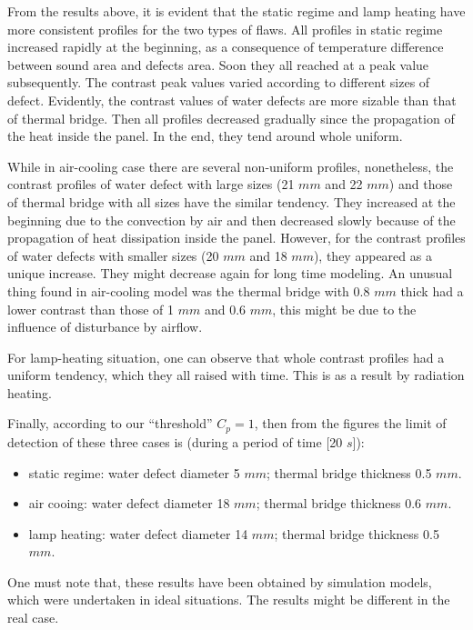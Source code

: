 \documentclass{tQRT2e}
\begin{document}
From the results above, it is evident that the static regime and lamp heating have more consistent profiles for the two types of flaws. All profiles in static regime increased rapidly at the beginning, as a consequence of temperature difference between sound area and defects area. Soon they all reached at a peak value subsequently. The contrast peak values varied according to different sizes of defect. Evidently, the contrast values of water defects are more sizable than that of thermal bridge. Then all profiles decreased gradually since the propagation of the heat inside the panel. In the end, they tend around whole uniform. 

While in air-cooling case there are several non-uniform profiles, nonetheless, the contrast profiles of water defect with large sizes (21 $mm $ and 22 $ mm $) and those of thermal bridge with all sizes have the similar tendency. They increased at the beginning due to the convection by air and then decreased slowly because of the propagation of heat dissipation inside the panel. However, for the contrast profiles of water defects with smaller sizes (20 $ mm $ and 18 $ mm $), they appeared as a unique increase. They might decrease again for long time modeling. An unusual thing found in air-cooling model was the thermal bridge with 0.8 $ mm $ thick had a lower contrast than those of 1 $mm $ and 0.6 $ mm $, this might be due to the influence of disturbance by airflow. 

For lamp-heating situation, one can observe that whole contrast profiles had a uniform tendency, which they all raised with time. This is as a result by radiation heating.

Finally, according to our “threshold” $ C_p  = 1$, then from the figures the limit of detection of these three cases is (during a period of time [20 $s$]): 
\begin{itemize}
  \item static regime: water defect diameter 5 $ mm $; thermal bridge thickness 0.5 $ mm $.
  \item air cooing: water defect diameter 18 $ mm $; thermal bridge thickness 0.6 $ mm $.
  \item lamp heating: water defect diameter 14 $ mm $; thermal bridge thickness 0.5 $ mm $.
\end{itemize}
One must note that, these results have been obtained by simulation models, which were undertaken in ideal situations. The results might be different in the real case.
\end{document}
